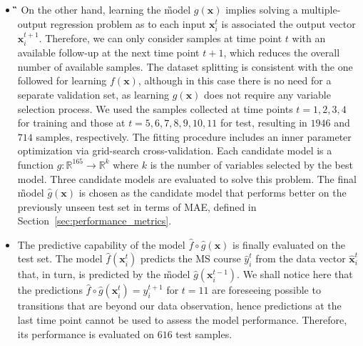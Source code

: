 \begin{itemize}
	\item[] \textbf{\G} %
	On the other hand, learning the \G model $g(\bm{x})$ implies solving a multiple-output regression problem as to each input $\bm{x}_i^t$ is associated the output vector $\bm{x}_i^{t+1}$.
	Therefore, we can only consider samples at time point $t$ with an available follow-up at the next time point $t+1$, which reduces the overall number of available samples.
	The dataset splitting is consistent with the one followed for learning $f(\bm{x})$, although in this case there is no need for a separate validation set, as learning $g(\bm{x})$ does not require any variable selection process. We used the samples collected at time points $t=1,2,3,4$ for training and those at $t=5,6,7,8,9,10,11$ for test, resulting in $1946$ and $714$ samples, respectively.
	The fitting procedure includes an inner parameter optimization via grid-search cross-validation. Each candidate model is a function
	$g: \mathbb{R}^{165} \rightarrow \mathbb{R}^k$ where $k$ is the number of variables selected by the best \F model.
	Three candidate models are evaluated to solve this problem.
	The final \G model $\hat{g}(\bm{x})$ is chosen as the candidate model that performs better on the previously unseen test set in terms of MAE, defined in Section~\ref{sec:performance_metrics}.
	

	\item[] \textbf{\FOG} The predictive capability of the \FOG model $\hat{f} \circ \hat{g}(\bm{x})$ is finally evaluated on the test set. The \F model $\hat{f}(\bm{x}_i^t)$ predicts the MS course $\hat{y}_i^t$ from the \PCO data vector $\hat{\bm{x}}_i^t$ that, in turn, is predicted by the \G model $\hat{g}(\bm{x}_i^{t-1})$. We shall notice here that the predictions $\hat{f} \circ \hat{g}(\bm{x}_i^t)=y_i^{t+1}$ for $t=11$ are foreseeing possible \RR to \SP transitions that are beyond our data observation, hence predictions at the last time point cannot be used to assess the \FOG model performance. Therefore, its performance is evaluated on $616$ test samples.
	
\end{itemize}







